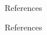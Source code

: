 \begin{frame}{References}
  \begin{block}{References}
    \scalebox{0.75}{\parbox{\textwidth}{\printbibliography[heading=none]}}
  \end{block}
\end{frame}
%
